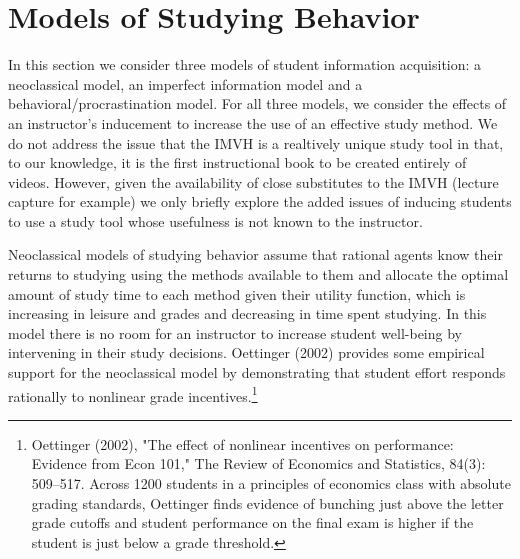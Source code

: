 \documentclass[12pt]{article}
\begin{document}

\section{Models of Studying Behavior}

In this section we consider three models of student information acquisition:  a neoclassical model, an imperfect information model and a behavioral/procrastination model.  For all three models, we consider the effects of an instructor's inducement to increase the use of an effective study method.  We do not address the issue that the IMVH is a realtively unique study tool in that, to our knowledge, it is the first instructional book to be created entirely of videos.  However, given the availability of close substitutes to the IMVH (lecture capture for example) we only briefly explore the added issues of inducing students to use a study tool whose usefulness is not known to the instructor.

Neoclassical models of studying behavior assume that rational agents know their returns to studying using the methods available to them and allocate the optimal amount of study time to each method given their utility function, which is increasing in leisure and grades and decreasing in time spent studying.  In this model there is no room for an instructor to increase student well-being by intervening in their study decisions.  Oettinger (2002) provides some empirical support for the neoclassical model by demonstrating that student effort responds rationally to nonlinear grade incentives.\footnote{Oettinger (2002), "The effect of nonlinear incentives on performance: Evidence from Econ 101," The Review of Economics and Statistics, 84(3): 509–517.  Across 1200 students in a principles of economics class with absolute grading standards, Oettinger finds evidence of bunching just above the letter grade cutoffs and student performance on the final exam is higher if the student is just below a grade threshold.} 
\end{document}
